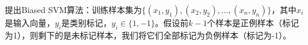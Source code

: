
\citet{1250918}提出Biased SVM算法\cite{1250918}：训练样本集为$\{(x_1,y_1),(x_2,y_2),\ldots,(x_n,y_n) \}$，其中$x_i$是输入向量，$y_i$是类别标记，$y_i \in \{1,-1\}$。假设前$k-1$个样本是正例样本（标记为1），则剩下的是未标记样本，我们将它们全部标记为负例样本（标记为-1）。


